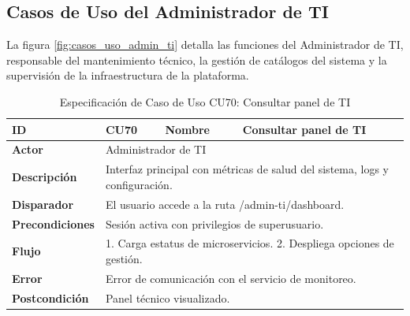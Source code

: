 \subsection{Casos de Uso del Administrador de TI}
\label{subsec:casos_uso_admin_ti}

La figura \ref{fig:casos_uso_admin_ti} detalla las funciones del Administrador de TI, responsable del mantenimiento técnico, la gestión de catálogos del sistema y la supervisión de la infraestructura de la plataforma.

\begingroup
\footnotesize %
\setlength{\parskip}{0pt} %
\setlength{\belowcaptionskip}{-10pt} %
\renewcommand{\arraystretch}{1.1} %

\begin{table}[ht!]
    \centering
    \caption{Especificación de Caso de Uso CU70: Consultar panel de TI}
    \label{tab:cu70}
    \begin{tabularx}{\textwidth}{|l|p{2cm}|l|X|}
        \hline
        \textbf{ID} & CU70 & \textbf{Nombre} & Consultar panel de TI \\ \hline
        \textbf{Actor} & \multicolumn{3}{X|}{Administrador de TI} \\ \hline
        \textbf{Descripción} & \multicolumn{3}{X|}{Interfaz principal con métricas de salud del sistema, logs y configuración.} \\ \hline
        \textbf{Disparador} & \multicolumn{3}{X|}{El usuario accede a la ruta /admin-ti/dashboard.} \\ \hline
        \textbf{Precondiciones} & \multicolumn{3}{X|}{Sesión activa con privilegios de superusuario.} \\ \hline
        \textbf{Flujo} & \multicolumn{3}{X|}{1. Carga estatus de microservicios. 2. Despliega opciones de gestión.} \\ \hline
        \textbf{Error} & \multicolumn{3}{X|}{Error de comunicación con el servicio de monitoreo.} \\ \hline
        \textbf{Postcondición} & \multicolumn{3}{X|}{Panel técnico visualizado.} \\ \hline
    \end{tabularx}
\end{table}

\vspace{-0.4cm} %

